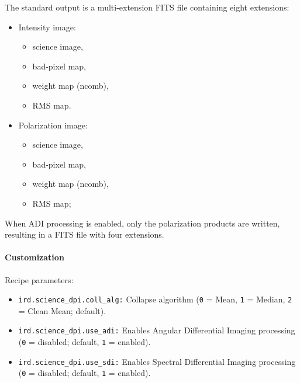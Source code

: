 The standard output is a multi-extension FITS file containing eight extensions:

\begin{itemize}
    \item Intensity image:
    \begin{itemize}
        \item science image,
        \item bad-pixel map,
        \item weight map (ncomb),
        \item RMS map.
    \end{itemize}
    
    \item Polarization image:
    \begin{itemize}
        \item science image,
        \item bad-pixel map,
        \item weight map (ncomb),
        \item RMS map;
    \end{itemize}
\end{itemize}

When ADI processing is enabled, only the polarization products are written,
resulting in a FITS file with four extensions.

\paragraph{Customization}

Recipe parameters:

\begin{itemize}

\item \texttt{ird.science\_dpi.coll\_alg:}
Collapse algorithm
(\texttt{0} = Mean,
 \texttt{1} = Median,
 \texttt{2} = Clean Mean; default).

\item \texttt{ird.science\_dpi.use\_adi:}
Enables Angular Differential Imaging processing
(\texttt{0} = disabled; default,
 \texttt{1} = enabled).

\item \texttt{ird.science\_dpi.use\_sdi:}
Enables Spectral Differential Imaging processing
(\texttt{0} = disabled; default,
 \texttt{1} = enabled).

\end{itemize}

